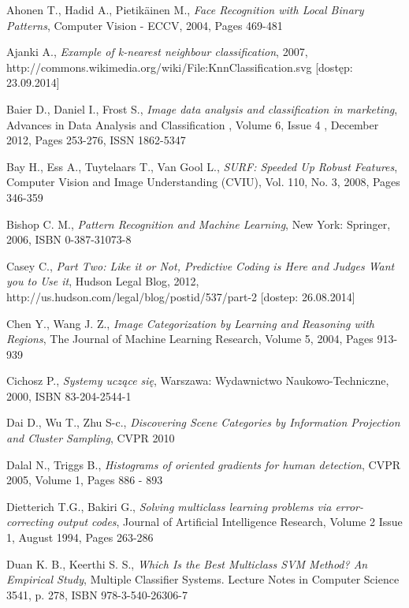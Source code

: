 \begin{thebibliography}{100} %

 Ahonen T., Hadid A., Pietikäinen M., \emph{Face Recognition with Local Binary Patterns}, Computer Vision - ECCV, 2004, Pages 469-481

 Ajanki A., \emph{Example of k-nearest neighbour classification}, 2007, http://commons.wikimedia.org/wiki/File:KnnClassification.svg [dostęp: 23.09.2014]

 Baier D., Daniel I., Frost S., \emph{Image data analysis and classification in marketing}, Advances in Data Analysis and Classification , Volume 6, Issue 4 , December 2012, Pages 253-276, ISSN 1862-5347

 Bay H., Ess A., Tuytelaars T., Van Gool L., \emph{SURF: Speeded Up Robust Features},  Computer Vision and Image Understanding (CVIU), Vol. 110, No. 3, 2008, Pages 346-359 

 Bishop C. M., \emph{Pattern Recognition and Machine Learning}, New York: Springer, 2006, ISBN 0-387-31073-8

 Casey C., \emph{Part Two: Like it or Not, Predictive Coding is Here and Judges Want you to Use it}, Hudson Legal Blog, 2012, http://us.hudson.com/legal/blog/postid/537/part-2 [dostep: 26.08.2014]

 Chen Y., Wang J. Z., \emph{Image Categorization by Learning and Reasoning with Regions}, The Journal of Machine Learning Research, Volume 5, 2004, Pages 913-939 

 Cichosz P., \emph{Systemy uczące się}, Warszawa: Wydawnictwo Naukowo-Techniczne, 2000, ISBN 83-204-2544-1

 Dai D., Wu T., Zhu S-c., \emph{Discovering Scene Categories by Information Projection and Cluster Sampling}, CVPR 2010

 Dalal N., Triggs B., \emph{Histograms of oriented gradients for human detection}, CVPR 2005, Volume 1, Pages 886 - 893 

 Dietterich T.G., Bakiri G., \emph{Solving multiclass learning problems via error-correcting output codes}, Journal of Artificial Intelligence Research, Volume 2 Issue 1, August 1994, Pages 263-286 

 Duan K. B., Keerthi S. S., \emph{Which Is the Best Multiclass SVM Method? An Empirical Study}, Multiple Classifier Systems. Lecture Notes in Computer Science 3541, p. 278, ISBN 978-3-540-26306-7


\end{thebibliography}
